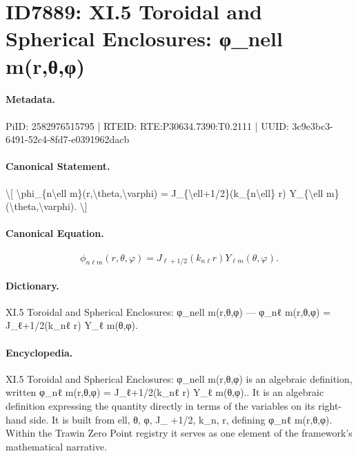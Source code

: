 \section*{ID7889: XI.5 Toroidal and Spherical Enclosures: φ\_nell m(r,θ,φ)}
\paragraph{Metadata.}
PiID: 2582976515795 | RTEID: RTE:P30634.7390:T0.2111 | UUID: 3c9e3bc3-6491-52c4-8fd7-e0391962dacb

\paragraph{Canonical Statement.}
\textbackslash{}[ \textbackslash{}phi\_\{n\textbackslash{}ell m\}(r,\textbackslash{}theta,\textbackslash{}varphi) = J\_\{\textbackslash{}ell+1/2\}(k\_\{n\textbackslash{}ell\} r) Y\_\{\textbackslash{}ell m\}(\textbackslash{}theta,\textbackslash{}varphi). \textbackslash{}]

\paragraph{Canonical Equation.}
\[
\phi_{n\ell m}(r,\theta,\varphi) = J_{\ell+1/2}(k_{n\ell} r) Y_{\ell m}(\theta,\varphi).
\]

\paragraph{Dictionary.}
XI.5 Toroidal and Spherical Enclosures: φ\_nell m(r,θ,φ) — φ\_nℓ m(r,θ,φ) = J\_ℓ+1/2(k\_nℓ r) Y\_ℓ m(θ,φ).

\paragraph{Encyclopedia.}
XI.5 Toroidal and Spherical Enclosures: φ\_nell m(r,θ,φ) is an algebraic definition, written φ\_nℓ m(r,θ,φ) = J\_ℓ+1/2(k\_nℓ r) Y\_ℓ m(θ,φ).. It is an algebraic definition expressing the quantity directly in terms of the variables on its right-hand side. It is built from ell, θ, φ, J\_ +1/2, k\_n, r, defining φ\_nℓ m(r,θ,φ). Within the Trawin Zero Point registry it serves as one element of the framework's mathematical narrative.
